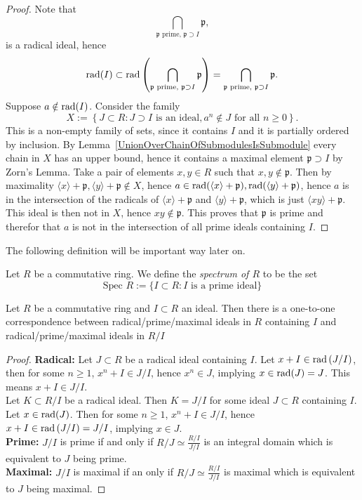 \begin{proof}
    Note that  
    $$\bigcap_{\mathfrak{p} \text{ prime, } \mathfrak{p}\supset I} \mathfrak{p},$$
    is a radical ideal, hence 
    $$\mathrm{rad}(I) \subset \mathrm{rad}\left(\bigcap_{\mathfrak{p} \text{ prime, } \mathfrak{p}\supset I} \mathfrak{p}\right) = \bigcap_{\mathfrak{p} \text{ prime, } \mathfrak{p}\supset I} \mathfrak{p}. $$  
    Suppose $a\notin \mathrm{rad}(I)$. Consider the family
    $$
        X := \left\{ J \subset R : J\supset I \text{ is an ideal}, a^n \notin J \text{ for all } n\geq 0\right\}. 
    $$
    This is a non-empty family of sets, since it contains $I$ and it is partially ordered by inclusion. By Lemma~\ref{UnionOverChainOfSubmodulesIsSubmodule} every chain in $X$ has an upper bound, hence it contains a maximal element $\mathfrak{p}\supset I$ by Zorn's Lemma. Take a pair of elements $x,y\in R$ such that $x,y\notin \mathfrak{p}$. Then by maximality $\langle x\rangle +\mathfrak{p},\langle y\rangle +\mathfrak{p}\notin X$, hence $a\in \mathrm{rad}(\langle x\rangle +\mathfrak{p}), \mathrm{rad}(\langle y\rangle +\mathfrak{p})$, hence $a$ is in the intersection of the radicals of $\langle x\rangle + \mathfrak{p}$ and $\langle y\rangle +\mathfrak{p}$, which is just $\langle xy\rangle + \mathfrak{p}$. This ideal is then not in $X$, hence $xy\notin \mathfrak{p}$. This proves that $\mathfrak{p}$ is prime and therefor that $a$ is not in the intersection of all prime ideals containing $I$.   
\end{proof}
The following definition will be important way later on. 
\begin{definition}
    Let $R$ be a commutative ring. We define the \textit{spectrum of $R$} to be the set 
    $$\text{Spec } R := \{ I \subset R : I \text{ is a prime ideal}\}$$
\end{definition}
\begin{proposition}\label{RadicalPrimeMaximalIdealsMatchThoseOfQuotientRings}
    Let $R$ be a commutative ring and $I\subset R$ an ideal. Then there is a one-to-one correspondence between radical/prime/maximal ideals in $R$ containing $I$ and radical/prime/maximal ideals in $R/I$  
\end{proposition}
\begin{proof}
    \textbf{Radical:} Let $J\subset R$ be a radical ideal containing $I$. Let $x+ I\in \mathrm{rad}\left(J/I\right)$, then for some $n\geq 1$, $x^n + I \in J/I$, hence $x^n \in J$, implying $x\in \mathrm{rad}(J) = J$. This means $x+I \in J/I$.\\
    Let $K \subset R/I$ be a radical ideal. Then $K=J/I$ for some ideal $J\subset R$ containing $I$. Let $x\in \mathrm{rad}(J)$. Then for some $n\geq 1$, $x^n+I\in J/I$, hence $x+I \in \mathrm{rad}\left(J/I\right) = J/I$, implying $x\in J$.\\  
    \textbf{Prime:}
        $J/I$ is prime if and only if $R/J\simeq \frac{R/I}{J/I}$ is an integral domain which is equivalent to $J$ being prime.\\    
    \textbf{Maximal:}
        $J/I$ is maximal if an only if $R/J\simeq \frac{R/I}{J/I}$ is maximal which is equivalent to $J$ being maximal.
\end{proof}
